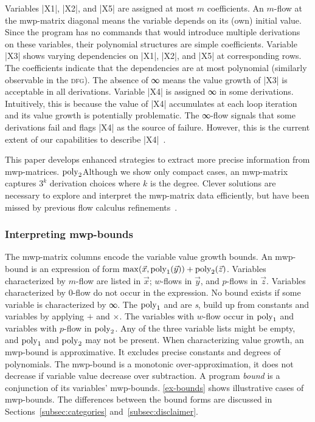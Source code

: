 \begin{example}
\noindent{}Variables \pr|X1|, \pr|X2|, and \pr|X5| are assigned at most \(m\){ }coefficients.
An \(m\)-flow at the mwp-matrix diagonal means the variable depends on its (own) initial value.
Since the program has no commands that would introduce multiple derivations on these variables, their polynomial structures are simple coefficients.
Variable \pr|X3| shows varying dependencies on \pr|X1|, \pr|X2|, and \pr|X5| at corresponding rows.
The coefficients indicate that the dependencies are at most polynomial (similarly observable in the \textsc{dfg}).
The absence of ∞ means the value growth of \pr|X3| is acceptable in all derivations.
Variable \pr|X4| is assigned ∞ in some derivations.
Intuitively, this is because the value of \pr|X4| accumulates at each loop iteration and its value growth is potentially problematic.
The ∞-flow signals that some derivations fail and flags \pr|X4| as the source of failure.
However, this is the current extent of our capabilities to describe \pr|X4|~\cite{aubert2023b}.
\end{example}

\noindent This paper develops enhanced strategies to extract more precise information from mwp-matrices.
$\operatorname{poly}_2$Although we show only compact cases, an mwp-matrix captures \(3^k\) derivation choices where \(k\) is the degree.
Clever solutions are necessary to explore and interpret the mwp-matrix data efficiently, but have been missed by previous flow calculus refinements~\cite{aubert20222,aubert2023b}.

\subsubsection{Interpreting mwp-bounds}
\label{subsec:interpreting-mwp-bounds}

The mwp-matrix columns encode the variable value growth bounds.
An mwp-bound is an expression of form $\max(\vec{x}, \operatorname{poly}_1(\vec{y})) + \operatorname{poly}_2(\vec{z})$.
Variables characterized by $m$-flow are listed in $\vec{x}$; $w$-flows in $\vec{y}$, and $p$-flows in $\vec{z}$.
Variables characterized by $0$-flow do not occur in the expression.
No bound exists if some variable is characterized by ∞.
The $\operatorname{poly}_1$ and  are \emph{s}, build up from constants and variables by applying $+$ and $\times$. %
The variables with \(w\)-flow occur in $\operatorname{poly}_1$ and variables with \(p\)-flow in $\operatorname{poly}_2$.
Any of the three variable lists might be empty, and $\operatorname{poly}_1$ and $\operatorname{poly}_2$ may not be present.
When characterizing value growth, an mwp-bound is approximative.
It excludes precise constants and degrees of polynomials.
The mwp-bound is a monotonic over-approximation, \ie it does not decrease if variable value decrease over subtraction.
A program \emph{bound} is a conjunction of its variables' mwp-bounds.
\autoref{ex-bounds} shows illustrative cases of mwp-bounds.
The differences between the bound forms are discussed in Sections~\ref{subsec:categories} and~\ref{subsec:disclaimer}.

